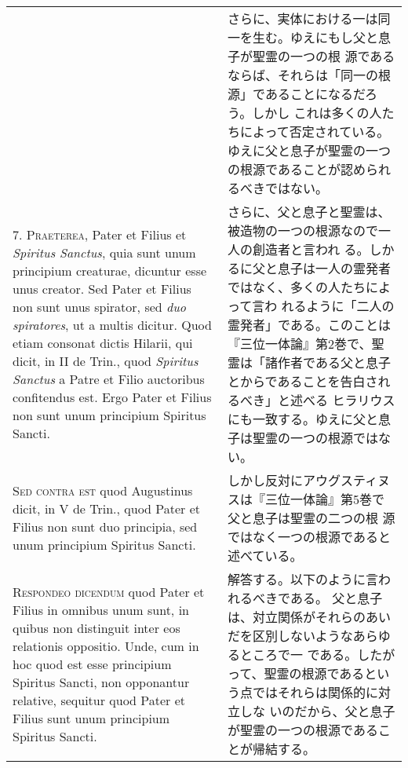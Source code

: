 \documentclass[10pt]{jsarticle} %
\begin{document}
\begin{longtable}{p{21em}p{21em}}
&

さらに、実体における一は同一を生む。ゆえにもし父と息子が聖霊の一つの根
 源であるならば、それらは「同一の根源」であることになるだろう。しかし
 これは多くの人たちによって否定されている。ゆえに父と息子が聖霊の一つ
 の根源であることが認められるべきではない。

\\



7. {\scshape Praeterea}, Pater et Filius et {\itshape  Spiritus Sanctus}, quia sunt
unum principium creaturae, dicuntur esse unus creator. Sed Pater et
Filius non sunt unus spirator, sed {\itshape duo spiratores}, ut a multis
dicitur. Quod etiam consonat dictis Hilarii, qui dicit, in II de
Trin., quod {\itshape  Spiritus Sanctus} a Patre et Filio auctoribus
confitendus est. Ergo Pater et Filius non sunt unum principium
Spiritus Sancti.

&

さらに、父と息子と聖霊は、被造物の一つの根源なので一人の創造者と言われ
 る。しかるに父と息子は一人の霊発者ではなく、多くの人たちによって言わ
 れるように「二人の霊発者」である。このことは『三位一体論』第2巻で、聖
 霊は「諸作者である父と息子とからであることを告白されるべき」と述べる
 ヒラリウスにも一致する。ゆえに父と息子は聖霊の一つの根源ではない。

\\



{\scshape Sed contra est} quod Augustinus dicit, in V de Trin., quod Pater et
Filius non sunt duo principia, sed unum principium  Spiritus Sancti.

&

しかし反対にアウグスティヌスは『三位一体論』第5巻で父と息子は聖霊の二つの根
 源ではなく一つの根源であると述べている。

\\



{\scshape Respondeo dicendum} quod Pater et Filius in omnibus unum sunt, in
quibus non distinguit inter eos relationis oppositio. Unde, cum in hoc
quod est esse principium Spiritus Sancti, non opponantur relative,
sequitur quod Pater et Filius sunt unum principium  Spiritus
Sancti. 

&

解答する。以下のように言われるべきである。
父と息子は、対立関係がそれらのあいだを区別しないようなあらゆるところで一
である。したがって、聖霊の根源であるという点ではそれらは関係的に対立しな
 いのだから、父と息子が聖霊の一つの根源であることが帰結する。


\end{longtable}
\end{document}
